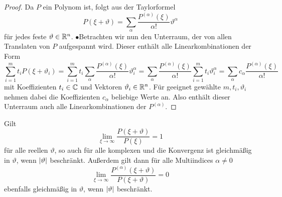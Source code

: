 \begin{proof}
\relax[$\supseteq$] Da $P$ ein Polynom ist, folgt aus der Taylorformel
\begin{equation}
P(\xi+\vartheta)=\sum_\alpha \dfrac{P^{(\alpha)}(\xi)}{\alpha!}\vartheta^{\alpha}
\end{equation}
für jedes feste $\vartheta\in\mathbb R^n$. $\bullet$\qquad [$\subseteq$] Betrachten wir nun den Unterraum, der von allen Translaten von $P$ aufgespannt wird. Dieser enthält alle Linearkombinationen der Form
\begin{equation}
\sum_{i=1}^m t_i P(\xi+\vartheta_i)=\sum_{i=1}^mt_i\sum_\alpha \dfrac{P^{(\alpha)}(\xi)}{\alpha!}\vartheta_i^\alpha =\sum_\alpha \dfrac{P^{(\alpha)}(\xi)}{\alpha!} \sum_{i=1}^mt_i\vartheta_i^\alpha=\sum_\alpha c_\alpha \dfrac{P^{(\alpha)}(\xi)}{\alpha!}
\end{equation}
mit Koeffizienten $t_i\in\mathbb C$ und Vektoren $\vartheta_i\in\mathbb R^n$. Für geeignet gewählte $ m,t_i,\vartheta_i $ nehmen dabei die Koeffizienten $c_\alpha$ beliebige Werte an. Also enthält dieser Unterraum auch alle Linearkombinationen der $P^{(\alpha)}$.
\end{proof}
\begin{lem}
Gilt
\begin{equation}
\lim_{\xi\to\infty}\dfrac{P(\xi+\vartheta)}{P(\xi)}=1
\end{equation}
für alle reellen $\vartheta$, so auch für alle komplexen und die Konvergenz ist gleichmäßig in $\vartheta$, wenn $\lvert\vartheta\rvert$ beschränkt. Außerdem gilt dann für alle Multiindices $\alpha\neq0$
\begin{equation}
\lim_{\xi\to\infty}\dfrac{P^{(\alpha)}(\xi+\vartheta)}{P(\xi+\vartheta)}=0
\end{equation}
ebenfalls gleichmäßig in $\vartheta$, wenn $\lvert\vartheta\rvert$ beschränkt.
\end{lem}
